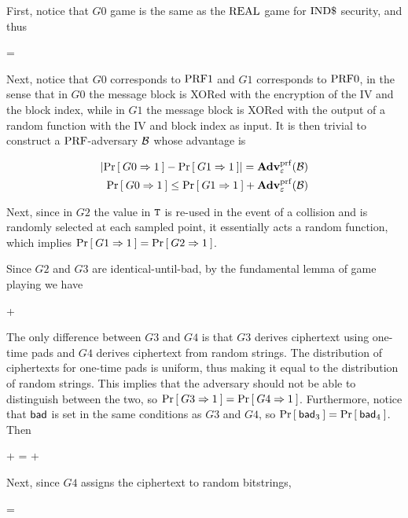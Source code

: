 First, notice that $G0$ game is the same as the $\textnormal{REAL}$ game for $\textnormal{IND\$}$
security, and thus

\bnm
{} = 
\enm

Next, notice that $G0$ corresponds to $\textup{PRF1}$ and $G1$ corresponds to
$\textup{PRF0}$, in the sense that in $G0$ the message block is XORed with the
encryption of the IV and the block index, while in $G1$ the message block is
XORed with the output of a random function with the IV and block index as input.
It is then trivial to construct a $\textnormal{PRF}$-adversary ${\mathcal B}$ whose advantage 
is

\begin{align*}
  \lvert\Pr\left[\: G0 \Rightarrow 1 \:\right] - \Pr\left[\: G1 \Rightarrow 1 \:\right]\rvert = \mathbf{Adv}^{\mathrm{prf}}_{\varepsilon}({\mathcal B}) \\
  \Pr\left[\: G0 \Rightarrow 1 \:\right] \leq \Pr\left[\: G1 \Rightarrow 1 \:\right] + \mathbf{Adv}^{\mathrm{prf}}_{\varepsilon}({\mathcal B})
\end{align*}

Next, since in $G2$ the value in $\mathtt{T}$ is re-used in the event of a collision
and is randomly selected at each sampled point, it essentially acts a random
function, which implies
$\Pr\left[\: G1 \Rightarrow 1 \:\right] = \Pr\left[\: G2 \Rightarrow 1 \:\right]$.

Since $G2$ and $G3$ are identical-until-bad, by the fundamental lemma of
game playing we have

\bnm
{} \leq {} + 
\enm

The only difference between $G3$ and $G4$ is that $G3$ derives ciphertext
using one-time pads and $G4$ derives ciphertext from random strings.
The distribution of ciphertexts for one-time pads is uniform, thus making
it equal to the distribution of random strings. This implies that the adversary
should not be able to distinguish between the two, so
$\Pr\left[\: G3 \Rightarrow 1 \:\right] = \Pr\left[\: G4 \Rightarrow 1 \:\right]$.
Furthermore, notice that $\mathsf{bad}$ is set in the same conditions as $G3$ and $G4$,
so $\Pr\left[\: \mathsf{bad}_3 \:\right] = \Pr\left[\: \mathsf{bad}_4 \:\right]$. Then

\bnm
{} +  =  + 
\enm

Next, since $G4$ assigns the ciphertext to random bitstrings,

\bnm
{} = 
\enm


